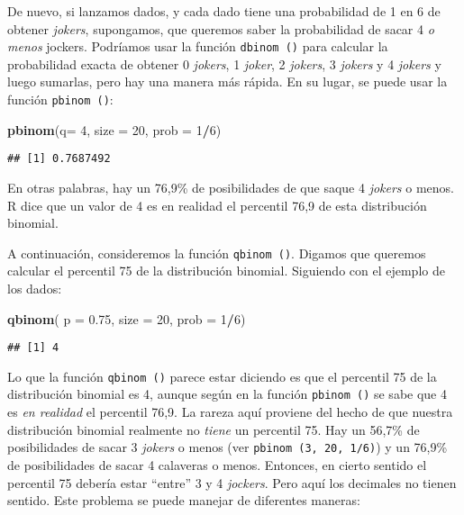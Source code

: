 \documentclass[
]{book}
\newenvironment{Shaded}{\begin{snugshade}}{\end{snugshade}}
\newcommand{\DataTypeTok}[1]{\textcolor[rgb]{0.13,0.29,0.53}{#1}}
\newcommand{\DecValTok}[1]{\textcolor[rgb]{0.00,0.00,0.81}{#1}}
\newcommand{\FloatTok}[1]{\textcolor[rgb]{0.00,0.00,0.81}{#1}}
\newcommand{\KeywordTok}[1]{\textcolor[rgb]{0.13,0.29,0.53}{\textbf{#1}}}
\newcommand{\NormalTok}[1]{#1}
\newcommand{\OperatorTok}[1]{\textcolor[rgb]{0.81,0.36,0.00}{\textbf{#1}}}
\begin{document}
De nuevo, si lanzamos dados, y cada dado tiene una probabilidad de 1 en 6 de obtener \emph{jokers}, supongamos, que queremos saber la probabilidad de sacar 4 \emph{o menos} jockers. Podríamos usar la función \texttt{dbinom\ ()} para calcular la probabilidad exacta de obtener 0 \emph{jokers}, 1 \emph{joker}, 2 \emph{jokers}, 3 \emph{jokers} y 4 \emph{jokers} y luego sumarlas, pero hay una manera más rápida. En su lugar, se puede usar la función \texttt{pbinom\ ()}:

\begin{Shaded}
\begin{Highlighting}[]
\KeywordTok{pbinom}\NormalTok{(}\DataTypeTok{q=} \DecValTok{4}\NormalTok{, }\DataTypeTok{size =} \DecValTok{20}\NormalTok{, }\DataTypeTok{prob =} \DecValTok{1}\OperatorTok{/}\DecValTok{6}\NormalTok{)}
\end{Highlighting}
\end{Shaded}

\begin{verbatim}
## [1] 0.7687492
\end{verbatim}

En otras palabras, hay un 76,9\% de posibilidades de que saque 4 \emph{jokers} o menos. R dice que un valor de 4 es en realidad el percentil 76,9 de esta distribución binomial.

A continuación, consideremos la función \texttt{qbinom\ ()}. Digamos que queremos calcular el percentil 75 de la distribución binomial. Siguiendo con el ejemplo de los dados:

\begin{Shaded}
\begin{Highlighting}[]
\KeywordTok{qbinom}\NormalTok{( }\DataTypeTok{p =} \FloatTok{0.75}\NormalTok{, }\DataTypeTok{size =} \DecValTok{20}\NormalTok{, }\DataTypeTok{prob =} \DecValTok{1}\OperatorTok{/}\DecValTok{6}\NormalTok{)}
\end{Highlighting}
\end{Shaded}

\begin{verbatim}
## [1] 4
\end{verbatim}

Lo que la función \texttt{qbinom\ ()} parece estar diciendo es que el percentil 75 de la distribución binomial es 4, aunque según en la función \texttt{pbinom\ ()} se sabe que 4 es \emph{en realidad} el percentil 76,9. La rareza aquí proviene del hecho de que nuestra distribución binomial realmente no \emph{tiene} un percentil 75. Hay un 56,7\% de posibilidades de sacar 3 \emph{jokers} o menos (ver \texttt{pbinom\ (3,\ 20,\ 1/6)}) y un 76,9\% de posibilidades de sacar 4 calaveras o menos. Entonces, en cierto sentido el percentil 75 debería estar ``entre'' 3 y 4 \emph{jockers}. Pero aquí los decimales no tienen sentido. Este problema se puede manejar de diferentes maneras:
\end{document}
